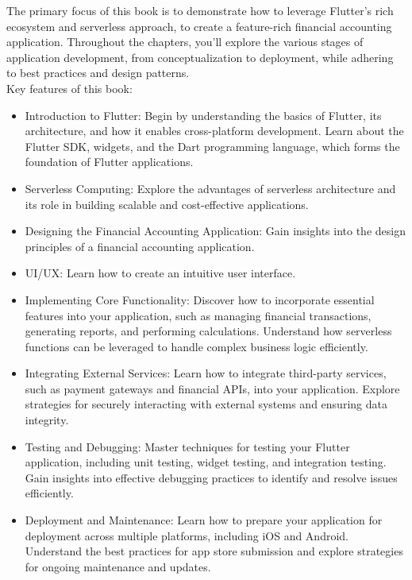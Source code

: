 The primary focus of this book is to demonstrate how to leverage Flutter's rich ecosystem and serverless approach, 
to create a feature-rich financial accounting application. Throughout the chapters, you'll explore the various 
stages of application development, from conceptualization to deployment, while adhering to best practices and 
design patterns.
\\
\noindent Key features of this book:
\begin{itemize}
    \item Introduction to Flutter: Begin by understanding the basics of Flutter, its architecture, and how it 
    enables cross-platform development. Learn about the Flutter SDK, widgets, and the Dart programming language, 
    which forms the foundation of Flutter applications.

    \item Serverless Computing: Explore the advantages of serverless architecture and its role in building 
    scalable and cost-effective applications.

    \item Designing the Financial Accounting Application: Gain insights into the design principles of a financial 
    accounting application. 
    
    \item UI/UX: Learn how to create an intuitive user interface.

    \item Implementing Core Functionality: Discover how to incorporate essential features into your application, 
    such as managing financial transactions, generating reports, and performing calculations. Understand how 
    serverless functions can be leveraged to handle complex business logic efficiently.

    \item Integrating External Services: Learn how to integrate third-party services, such as payment gateways 
    and financial APIs, into your application. Explore strategies for securely interacting with external 
    systems and ensuring data integrity.

    \item Testing and Debugging: Master techniques for testing your Flutter application, including unit testing, 
    widget testing, and integration testing. Gain insights into effective debugging practices to identify and 
    resolve issues efficiently.

    \item Deployment and Maintenance: Learn how to prepare your application for deployment across multiple 
    platforms, including iOS and Android. Understand the best practices for app store submission and explore 
    strategies for ongoing maintenance and updates.
\end{itemize}

